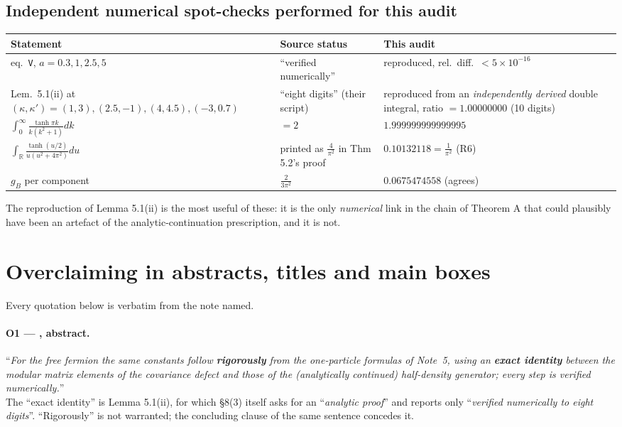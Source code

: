 \documentclass[11pt]{article}
\begin{document}
\subsection{Independent numerical spot-checks performed for this audit}
\begin{center}\small
\begin{tabular}{@{}L{0.42\textwidth} L{0.26\textwidth} L{0.26\textwidth}@{}}
\toprule
Statement & Source status & This audit\\
\midrule
\NVII{} eq.~\texttt{V}, $a=0.3,1,2.5,5$ & ``verified numerically'' & reproduced, rel.\ diff.\ $<5\times10^{-16}$\\
\NVII{} Lem.~5.1(ii) at $(\kappa,\kappa')=(1,3),(2.5,-1),(4,4.5),(-3,0.7)$ & ``eight digits'' (their script) & reproduced from an \emph{independently derived} double integral, ratio $=1.00000000$ (10 digits)\\
$\int_0^\infty\frac{\tanh\pi k}{k(k^2+1)}dk$ & $=2$ & $1.999999999999995$\\
$\int_{\mathbb R}\frac{\tanh(u/2)}{u(u^2+4\pi^2)}du$ & printed as $\frac4{\pi^2}$ in Thm 5.2's proof & $0.10132118=\frac1{\pi^2}$ (R6)\\
$g_B$ per component & $\frac2{3\pi^2}$ & $0.0675474558$ (agrees)\\
\bottomrule
\end{tabular}
\end{center}
The reproduction of Lemma 5.1(ii) is the most useful of these: it is the only \emph{numerical} link in the chain of
Theorem A that could plausibly have been an artefact of the analytic-continuation prescription, and it is not.

\clearpage
\section{Overclaiming in abstracts, titles and main boxes}

Every quotation below is verbatim from the note named.

\paragraph{O1 --- \NVII, abstract. }
``\emph{For the free fermion the same constants follow \textbf{rigorously} from the one-particle formulas of Note~5,
using an \textbf{exact identity} between the modular matrix elements of the covariance defect and those of the
(analytically continued) half-density generator; every step is verified numerically.}''\\
The ``exact identity'' is Lemma 5.1(ii), for which \NVII{} \S8(3) itself asks for an ``\emph{analytic proof}'' and
reports only ``\emph{verified numerically to eight digits}''.  ``Rigorously'' is not warranted; the concluding clause
of the same sentence concedes it.
\end{document}
